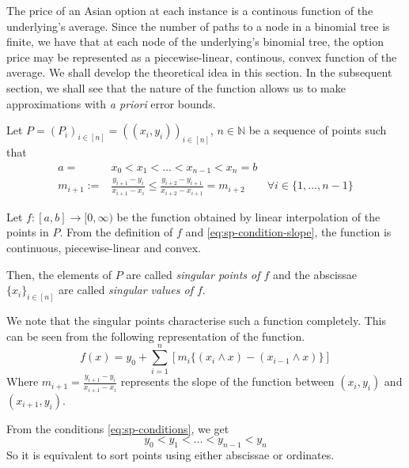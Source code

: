 The price of an Asian option at each instance is a continous function of the underlying's average. Since the number of paths to a node in a binomial tree is finite, we have that at each node of the underlying's binomial tree, the option price may be represented as a piecewise-linear, continous, convex function of the average. We shall develop the theoretical idea in this section. In the subsequent section, we shall see that the nature of the function allows us to make approximations with \emph{a priori} error bounds.


\begin{dfn} \label{def:sp-sp}
	Let $ P = (P_i)_{i \in [n]} = ( (x_i, y_i) )_{i \in [n]} $, $ n \in \mathbb{N} $ be a sequence of points such that
	\begin{subequations} \label{eq:sp-conditions}
		\begin{align}
			a =& x_0 < x_1 < \dots < x_{n-1} < x_n = b \\
			\label{eq:sp-condition-slope}
			m_{i+1} :=& \frac{y_{i+1} - y_{i}}{x_{i+1} - x_{i}} \leq \frac{y_{i+2} - y_{i+1}}{x_{i+2} - x_{i+1}} = m_{i+2} \qquad \forall i \in \{ 1, \dots, n-1 \}
		\end{align}
	\end{subequations}
	
	Let $ f:[a,b] \to [0, \infty) $ be the function obtained by linear interpolation of the points in $P$. From the definition of $f$ and	 \ref{eq:sp-condition-slope}, the function is continuous, piecewise-linear and convex.
	
	Then, the elements of $P$ are called \emph{singular points of $f$} and the abscissae $ \{ x_i \}_{i \in [n]} $ are called \emph{singular values of $f$}.
\end{dfn}


\begin{rem} \label{rem:sp-characterisation}
	We note that the singular points characterise such a function completely. This can be seen from the following representation of the function.
	\begin{equation}
		\label{eq:sp-function-repr}
		f(x) = y_0 + \sum_{i=1}^n [ m_i \{ (x_{i} \wedge x) - (x_{i-1} \wedge x) \} ]
	\end{equation}
	Where $ m_{i+1} = \frac{y_{i+1} - y_{i}}{x_{i+1} - x_{i}} $ represents the slope of the function between $ (x_{i}, y_{i}) $ and $ (x_{i+1}, y_{i}) $.
\end{rem}

\begin{rem}
	From the conditions \ref{eq:sp-conditions}, we get
	\begin{equation*}
		y_0 < y_1 < \dots < y_{n-1} < y_n
	\end{equation*}
	So it is equivalent to sort points using either abscissae or ordinates.
\end{rem}



